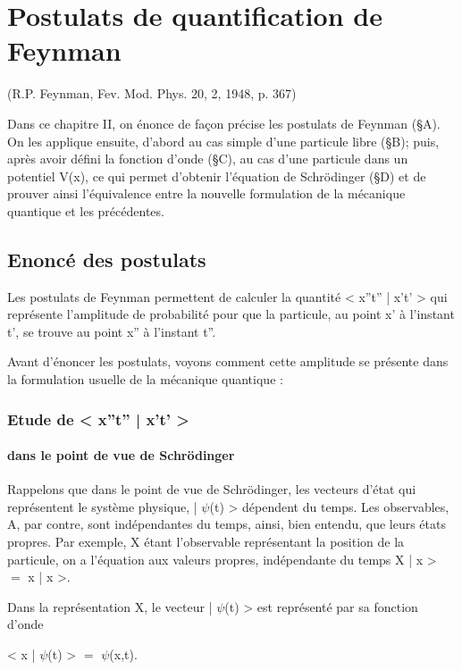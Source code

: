 \chapter{Postulats de quantification de Feynman}

\hfill (R.P. Feynman, Fev. Mod. Phys. 20, 2, 1948, p. 367)

\vspace{.5cm}
Dans ce chapitre II, on énonce de façon précise les postulats de Feynman
(\S A). On les applique ensuite, d'abord au cas simple d'une particule libre
(\S B); puis, après avoir défini la fonction d'onde (\S C), au cas d'une particule dans un potentiel V(x), ce qui permet d'obtenir l'équation de Schrödinger
(\S D) et de prouver ainsi l'équivalence entre la nouvelle formulation de la
mécanique quantique et les précédentes.

\section{Enoncé des postulats}

Les postulats de Feynman permettent de calculer la quantité
< x''t'' | x't' > qui représente l'amplitude de probabilité pour que la
particule, au point x' à l'instant t', se trouve au point x'' à l'instant
t''.

Avant d'énoncer les postulats, voyons comment cette amplitude
se présente dans la formulation usuelle de la mécanique quantique :

\subsection{Etude de < x''t'' | x't' >}

\subsubsection{dans le point de vue de Schrödinger}

Rappelons que dans le point de vue de Schrödinger, les vecteurs
d'état qui représentent le système physique, | $\psi$(t) > dépendent du temps.
Les observables, A, par contre, sont indépendantes du temps, ainsi, bien
entendu, que leurs états propres. Par exemple, X étant l'observable représentant
la position de la particule, on a l'équation aux valeurs propres,
indépendante du temps X | x > $=$ x | x >.

Dans la représentation X, le vecteur | $\psi$(t) > est représenté
par sa fonction d'onde
\begin{center}
< x | $\psi$(t) > $=$ $\psi$(x,t).
\end{center}

